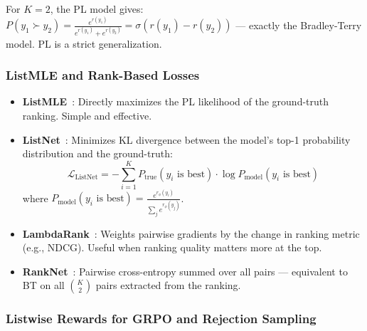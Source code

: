 \begin{intuitionbox}
For $K=2$, the PL model gives: $P(y_1 \succ y_2) = \frac{e^{r(y_1)}}{e^{r(y_1)} + e^{r(y_2)}} = \sigma(r(y_1) - r(y_2))$ --- exactly the Bradley-Terry model. PL is a strict generalization.
\end{intuitionbox}

\subsubsection*{ListMLE and Rank-Based Losses}
\label{listmle-and-rank-based-losses}

\begin{keybox}
\begin{itemize}
  \item \textbf{ListMLE}~\cite{xia2008listwise}: Directly maximizes the PL likelihood of the ground-truth ranking. Simple and effective.
  \item \textbf{ListNet}~\cite{cao2007listnet}: Minimizes KL divergence between the model’s top-1 probability distribution and the ground-truth: 
\[
\mathcal{L}_{\text{ListNet}} = -\sum_{i=1}^{K} P_{\text{true}}(y_i \text{ is best}) \cdot \log P_{\text{model}}(y_i \text{ is best})
\]
 where $P_{\text{model}}(y_i \text{ is best}) = \frac{e^{r_\phi(y_i)}}{\sum_j e^{r_\phi(y_j)}}$.
  \item \textbf{LambdaRank}~\cite{burges2006lambdarank}: Weights pairwise gradients by the change in ranking metric (e.g., NDCG). Useful when ranking quality matters more at the top.
  \item \textbf{RankNet}~\cite{burges2005ranknet}: Pairwise cross-entropy summed over all pairs --- equivalent to BT on all $\binom{K}{2}$ pairs extracted from the ranking.
\end{itemize}
\end{keybox}

\subsubsection*{Listwise Rewards for GRPO and Rejection Sampling}
\label{listwise-rewards-for-grpo-and-rejection-sampling}

